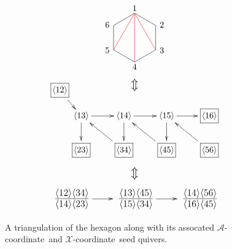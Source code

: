 \documentclass[12pt]{article}
\def\ket#1{\langle #1 \rangle}
\def\xcoord{$\mathcal{X}$-coordinate}
\def\acoord{$\mathcal{A}$-coordinate}
\def\drawLabeledHexagon{
\coordinate (P1) at (90:1);
\coordinate (P2) at (30:1);
\coordinate (P3) at (330:1);
\coordinate (P4) at (270:1);
\coordinate (P5) at (210:1);
\coordinate (P6) at (150:1);
\draw (P1) -- (P2) -- (P3) -- (P4) -- (P5) -- (P6) -- cycle;
\draw (0,1.2) node {1};
\draw (30:1.05) node[anchor=west] {2};
\draw (330:1.05) node[anchor=west] {3};
\draw (270:1.2) node {4};
\draw (210:1.05) node[anchor=east] {5};
\draw (150:1.05) node[anchor=east] {6};
}
\begin{document}
\begin{figure}
\begin{equation*}
\begin{gathered}
\begin{tikzpicture}
	\drawLabeledHexagon
  	\draw[color=red] (P1) -- (P3);
  	\draw[color=red] (P1) -- (P4);
  	\draw[color=red] (P1) -- (P5);
\end{tikzpicture}
\\ \scalebox{1.4}{$\Updownarrow$}
\\ \ \vspace{-1.1cm} \ \\
\begin{xy} 0;<1pt,0pt>:<0pt,-1pt>::
	(25,30) *+{\langle 13\rangle} ="0",
	(75,30) *+{\langle 14\rangle} ="1",
	(125,30) *+{\langle 15\rangle} ="2",
	(0,0) *+{\framebox[5ex]{$\langle 12\rangle$}} ="3",
	(25,70) *+{\framebox[5ex]{$\langle 23\rangle$}} ="4",
	(75,70) *+{\framebox[5ex]{$\langle 34\rangle$}} ="5",
	(125,70) *+{\framebox[5ex]{$\langle 45\rangle$}} ="6",
	(175,70) *+{\framebox[5ex]{$\langle 56\rangle$}} ="7",
	(175,30) *+{\framebox[5ex]{$\langle 16\rangle$}} ="8",
	"0", {\ar"1"},
	"1", {\ar"2"},
	"3", {\ar"0"},
	"0", {\ar"4"},
	"5", {\ar"0"},
	"1", {\ar"5"},
	"6", {\ar"1"},
	"2", {\ar"6"},
	"7", {\ar"2"},
	"2", {\ar"8"},
\end{xy} \\ 
\ \vspace{-.4cm} \ \\ 
\scalebox{1.4}{$\Updownarrow$} \\ 
\ \vspace{-.4cm} \ \\ 
\begin{xy} 0;<1pt,0pt>:<0pt,-1pt>::
	(0,0) *+\txt{\fontsize{16pt}{16pt} $\frac{\ket{12}\ket{34}}{\ket{14}\ket{23}}$} ="0",
	(75,0) *+\txt{\fontsize{16pt}{16pt} $\frac{\ket{13}\ket{45}}{\ket{15}\ket{34}}$} ="1",
	(150,0) *+\txt{\fontsize{16pt}{16pt} $\frac{\ket{14}\ket{56}}{\ket{16}\ket{45}}$} ="2",
	"0", {\ar"1"},
	"1", {\ar"2"},
\end{xy}
\end{gathered} 
\end{equation*}
\caption{A triangulation of the hexagon along with its assocated \acoord\ and \xcoord\ seed quivers.}
\label{eq:gr26-seed}
\end{figure}
\end{document}
